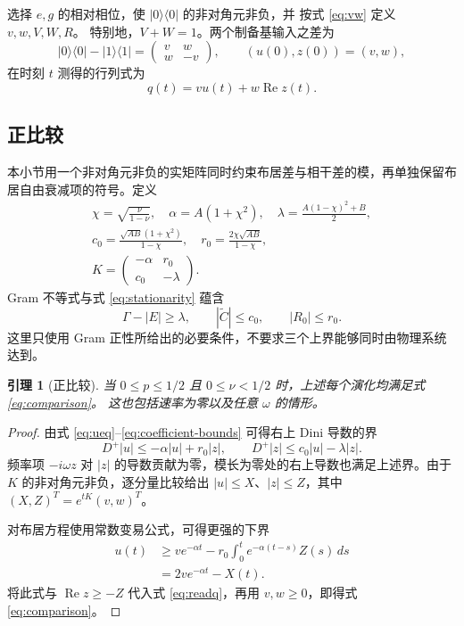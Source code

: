 \documentclass[aps,pra,reprint,amsmath,amssymb,nofootinbib,floatfix,longbibliography]{revtex4-2}
\theoremstyle{aps}
\newtheorem{lemma}[theorem]{引理}
\newcommand{\proj}[1]{|#1\rangle\langle#1|}
\begin{document}
选择 $e,g$ 的相对相位，使 $\proj0$ 的非对角元非负，并
按式 \eqref{eq:vw} 定义 $v,w,V,W,R$。
特别地，$V+W=1$。两个制备基输入之差为
\begin{equation}\label{eq:initial}
 \proj0-\proj1=\begin{pmatrix}v&w\\w&-v\end{pmatrix},
 \qquad (u(0),z(0))=(v,w),
\end{equation}
在时刻 $t$ 测得的行列式为
\begin{equation}\label{eq:readq}
 q(t)=v u(t)+w\operatorname{Re}z(t).
\end{equation}

\subsection{正比较}

本小节用一个非对角元非负的实矩阵同时约束布居差与相干差的模，再单独保留布居自由衰减项的符号。定义
\begin{equation}\label{eq:comparison-coeff}
 \begin{gathered}
 \chi=\sqrt{\frac\nu{1-\nu}},\quad \alpha=A(1+\chi^2),\quad
 \lambda=\frac{A(1-\chi)^2+B}{2},\\
 c_0=\frac{\sqrt{AB}(1+\chi^2)}{1-\chi},\quad
 r_0=\frac{2\chi\sqrt{AB}}{1-\chi},\\
 K=\begin{pmatrix}-\alpha&r_0\\c_0&-\lambda\end{pmatrix}.
 \end{gathered}
\end{equation}
Gram 不等式与式 \eqref{eq:stationarity} 蕴含
\begin{equation}\label{eq:coefficient-bounds}
 \Gamma-|E|\ge\lambda,\qquad
 |\widetilde C|\le c_0,\qquad |R_0|\le r_0.
\end{equation}
这里只使用 Gram 正性所给出的必要条件，不要求三个上界能够同时由物理系统达到。

\begin{lemma}[正比较]\label{lem:comparison}
当 $0\le p\le1/2$ 且 $0\le\nu<1/2$ 时，上述每个演化均满足式 \eqref{eq:comparison}。
这也包括速率为零以及任意 $\omega$ 的情形。
\end{lemma}

\begin{proof}
由式 \eqref{eq:ueq}--\eqref{eq:coefficient-bounds} 可得右上 Dini 导数的界
\[
 D^+|u|\le-\alpha|u|+r_0|z|,\qquad
 D^+|z|\le c_0|u|-\lambda|z|.
\]
频率项 $-i\omega z$ 对 $|z|$ 的导数贡献为零，模长为零处的右上导数也满足上述界。由于 $K$ 的非对角元非负，逐分量比较给出 $|u|\le X$、$|z|\le Z$，其中 $(X,Z)^T=e^{tK}(v,w)^T$。

对布居方程使用常数变易公式，可得更强的下界
\begin{align*}
 u(t)&\ge ve^{-\alpha t}-r_0\int_0^t e^{-\alpha(t-s)}Z(s)\,ds\\
 &=2ve^{-\alpha t}-X(t).
\end{align*}
将此式与 $\operatorname{Re}z\ge-Z$ 代入式 \eqref{eq:readq}，再用 $v,w\ge0$，即得式 \eqref{eq:comparison}。
\end{proof}
\end{document}
